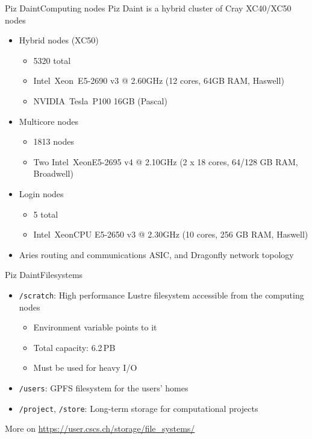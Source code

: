 \begin{frame}{Piz Daint}{Computing nodes}
  Piz Daint is a hybrid cluster of Cray XC40/XC50 nodes
  \begin{itemize}
  \item Hybrid nodes (XC50)
    \begin{itemize}
    \item 5320 total
    \item Intel\textregistered\ Xeon\textregistered\ E5-2690 v3 @ 2.60GHz (12 cores, 64GB RAM, Haswell)
    \item NVIDIA\textregistered\ Tesla\textregistered\ P100 16GB (Pascal)
    \end{itemize}
  \item Multicore nodes
    \begin{itemize}
    \item 1813 nodes
    \item Two Intel\textregistered\ Xeon\textregistered E5-2695 v4 @ 2.10GHz (2 x 18 cores, 64/128 GB RAM, Broadwell)
    \end{itemize}
  \item Login nodes
    \begin{itemize}
    \item 5 total
    \item Intel\textregistered\ Xeon\textregistered CPU E5-2650 v3 @ 2.30GHz (10 cores, 256 GB RAM, Haswell)
    \end{itemize}
  \item Aries routing and communications ASIC, and Dragonfly network topology
  \end{itemize}
\end{frame}

\begin{frame}{Piz Daint}{Filesystems}
  \begin{itemize}
  \item \texttt{/scratch}: High performance Lustre filesystem accessible from the computing nodes
    \begin{itemize}
    \item Environment variable  points to it
    \item Total capacity: 6.2\,PB
    \item Must be used for heavy I/O
    \end{itemize}
  \item \texttt{/users}: GPFS filesystem for the users' homes
  \item \texttt{/project}, \texttt{/store}: Long-term storage for computational projects
  \end{itemize}
  \vfill
  More on \url{https://user.cscs.ch/storage/file_systems/}
\end{frame}

